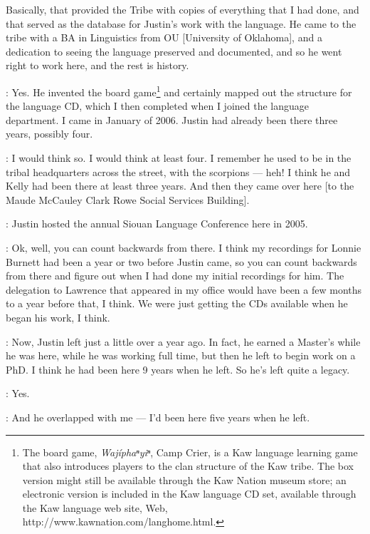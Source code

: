 \documentclass[output=paper]{LSP/langsci}
\begin{document}
Basically, that provided the Tribe with copies of everything that I had done, and that served as the database for Justin's work with the language. He came to the tribe with a BA in Linguistics from OU [University of Oklahoma], and a dedication to seeing the language preserved and documented, and so he went right to work here, and the rest is history.

: Yes. He invented the board game\footnote{The board game, \textit{Waj\'iphaⁿyiⁿ}, Camp Crier, is a Kaw language learning game that also introduces players to the clan structure of the Kaw tribe. The box version might still be available through the Kaw Nation museum store; an electronic version is included in the Kaw language CD set, available through the Kaw language web site, Web, {http://www.kawnation.com/langhome.html}.} and certainly mapped out the structure for the language CD, which I then completed when I joined the language department. I came in January of 2006. Justin had already been there three years, possibly four.

: I would think so. I would think at least four. I remember he used to be in the tribal headquarters across the street, with the scorpions --- heh! I think he and Kelly had been there at least three years. And then they came over here [to the Maude McCauley Clark Rowe Social Services Building].

: Justin hosted the annual Siouan Language Conference here in 2005. 

: Ok, well, you can count backwards from there. I think my recordings for Lonnie Burnett had been a year or two before Justin came, so you can count backwards from there and figure out when I had done my initial recordings for him. The delegation to Lawrence that appeared in my office would have been a few months to a year before that, I think. We were just getting the CDs available when he began his work, I think.

: Now, Justin left just a little over a year ago. In fact, he earned a Master's while he was here, while he was working full time, but then he left to begin work on a PhD. I think he had been here 9 years when he left. So he's left quite a legacy.

: Yes.

: And he overlapped with me --- I'd been here five years when he left.
\end{document}
